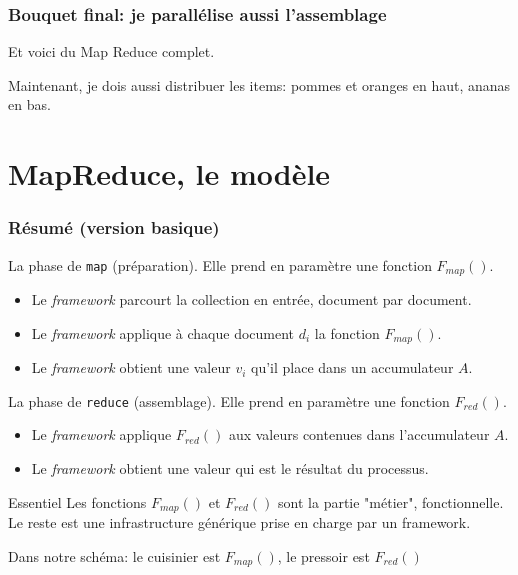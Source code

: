 \begin{frame}[fragile]
\frametitle{Bouquet final: je parallélise aussi l'assemblage}

Et voici du Map Reduce complet.


Maintenant, je dois aussi \alert{distribuer} les items: pommes et oranges en
haut, ananas en bas.

\end{frame}


\section{MapReduce, le modèle}


\begin{frame}[fragile]
\frametitle{Résumé (version basique)}

La phase de \texttt{map} (préparation). Elle prend en paramètre une fonction $F_{map}()$.

\begin{itemize}
  \item Le \textit{framework} parcourt la collection en entrée, document par document.
  \item Le \textit{framework} applique à chaque document $d_i$ la fonction  $F_{map}()$.
  \item Le \textit{framework} obtient une valeur $v_i$ qu'il place dans un \alert{accumulateur} $A$.
\end{itemize}

\medskip

La phase de \texttt{reduce} (assemblage). Elle prend en paramètre une fonction $F_{red}()$.


\begin{itemize}
  \item Le \textit{framework} applique $F_{red}()$ aux valeurs contenues  dans l'accumulateur $A$.
  \item Le \textit{framework} obtient une valeur qui est le résultat du processus. 
\end{itemize}

\begin{defblock}{Essentiel}
Les fonctions $F_{map}()$ et $F_{red}()$ sont \alert{la partie "métier", fonctionnelle}. Le reste
est une \alert{infrastructure générique} prise en charge par un \alert{framework}.
\end{defblock}

Dans notre schéma: le cuisinier est $F_{map}()$, le pressoir est $F_{red}()$ 
\end{frame}


